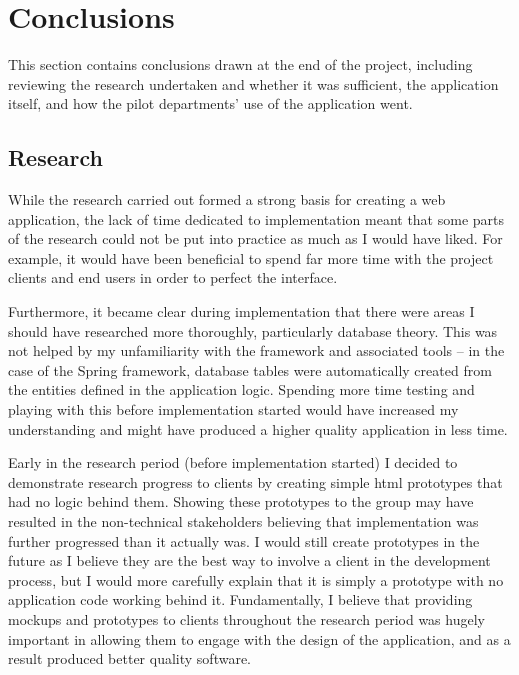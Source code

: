 
\section{Conclusions}
\label{sec:conclusions}

This section contains conclusions drawn at the end of the project, including
reviewing the research undertaken and whether it was sufficient, the
application itself, and how the pilot departments' use of the application
went.



\subsection{Research}

While the research carried out formed a strong basis for creating a web
application, the lack of time dedicated to implementation meant that some
parts of the research could not be put into practice as much as I would have
liked. For example, it would have been beneficial to spend far more time with
the project clients and end users in order to perfect the interface.

Furthermore, it became clear during implementation that there were areas I
should have researched more thoroughly, particularly database theory. This was
not helped by my unfamiliarity with the framework and associated tools -- in
the case of the Spring framework, database tables were automatically created
from the entities defined in the application logic. Spending more time testing
and playing with this before implementation started would have increased my
understanding and might have produced a higher quality application in less
time.

Early in the research period (before implementation started) I decided to
demonstrate research progress to clients by creating simple \gls{html}
prototypes that had no logic behind them. Showing these prototypes to the
group may have resulted in the non-technical stakeholders believing that
implementation was further progressed than it actually was. I would still
create prototypes in the future as I believe they are the best way to involve
a client in the development process, but I would more carefully explain that
it is simply a prototype with no application code working behind it.
Fundamentally, I believe that providing mockups and prototypes to clients
throughout the research period was hugely important in allowing them to engage
with the design of the application, and as a result produced better quality
software.


